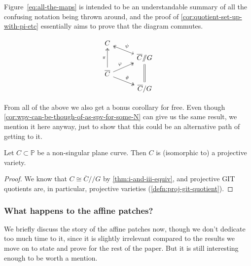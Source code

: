 \documentclass[10pt,notitlepage]{article}
\numberwithin{equation}{subsection}
\newcommand{\pee}{\mathbb{P}}
\newcommand{\cover}[1]{\overline{#1}}
\newcommand{\sslash}{/\!\!/}
\begin{document}
        Figure~\ref{eq:all-the-maps} is intended to be an understandable summary of all the confusing notation being thrown around, and the proof of \cref{cor:quotient-set-up-with-pi-etc} essentially aims to prove that the diagram commutes.

        \begin{equation}\label{eq:all-the-maps}
            \begin{tikzcd}[column sep=3em, row sep=0.5em]
                C
                &
                \\
                &
                \cover{C}\sslash G
                    \ular[hookleftarrow, two heads, swap]{\psi}
                    \arrow[-, double equal sign distance]{dd}
                \\
                \cover{C}
                    \arrow[two heads]{uu}{\pi}
                    \urar[two heads]{\varphi}
                    \drar[two heads]{\vartheta}
                &
                \\
                &
                \cover{C}/G
            \end{tikzcd}
        \end{equation}

        From all of the above we also get a bonus corollary for free.
        Even though \cref{cor:wpv-can-be-though-of-as-spv-for-some-N} can give us the same result, we mention it here anyway, just to show that this could be an alternative path of getting to it.

        \begin{corollary}
            Let $C\subset\pee$ be a non-singular plane curve.
            Then $C$ is (isomorphic to) a projective variety.
        \end{corollary}

        \begin{proof}
            We know that $C\cong\cover{C}\sslash G$ by \cref{thm:i-and-iii-equiv}, and projective GIT quotients are, in particular, projective varieties (\cref{defn:proj-git-quotient}).
        \end{proof}



        \subsubsection{What happens to the affine patches?} %
        \label{ssub:what_happens_to_the_affine_patches_}

        We briefly discuss the story of the affine patches now, though we don't dedicate too much time to it, since it is slightly irrelevant compared to the results we move on to state and prove for the rest of the paper.
        But it is still interesting enough to be worth a mention.
\end{document}
